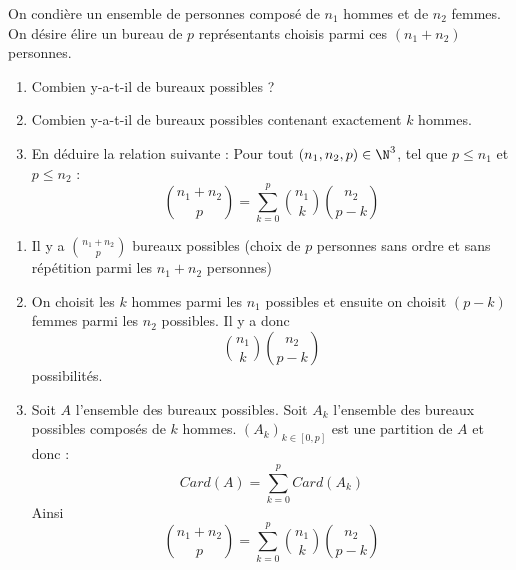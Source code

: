 \documentclass[a4paper, 11pt,reqno]{article}
\begin{document}
\begin{exercice}
On condière un ensemble de personnes composé de $n_1$ hommes et de $n_2 $ femmes. On désire élire un bureau de $p$ représentants choisis parmi ces $(n_1+n_2)$ personnes. 
\begin{enumerate}
\item Combien y-a-t-il  de bureaux possibles ? 
\item Combien y-a-t-il  de bureaux possibles contenant exactement $k$ hommes. 
\item En déduire la relation suivante :
Pour tout $(n_1, n_2 , p )\in \N^3$, tel que $p\leq n_1$ et $p\leq n_2$ :
$$\binom{n_1+n_2}{p} =\sum_{k=0}^p \binom{n_1}{k}\binom{n_2}{p-k}$$

\end{enumerate}
\end{exercice}
\begin{correction}
\begin{enumerate}
\item Il y a $\binom{n_1+n_2}{p}$ bureaux possibles (choix de $p$ personnes sans ordre et sans répétition parmi les  $n_1+n_2$ personnes)
\item On choisit les $k$ hommes parmi les $n_1$ possibles et ensuite on choisit $(p-k)$ femmes parmi les $n_2$ possibles. Il y a donc 
$$\binom{n_1}{k}\binom{n_2}{p-k}$$ 
possibilités. 
\item Soit $A$ l'ensemble des bureaux possibles. 
Soit $A_k$ l'ensemble des bureaux  possibles composés de $k$ hommes. 
$(A_k)_{k\in [0,p]}  $ est une partition de $A$ et donc : 
$$Card(A)  =\sum_{k=0}^p Card(A_k)$$
Ainsi 
$$\binom{n_1+n_2}{p}= \sum_{k=0}^p \binom{n_1}{k}\binom{n_2}{p-k}$$ 

\end{enumerate}
\end{correction}
\end{document}
